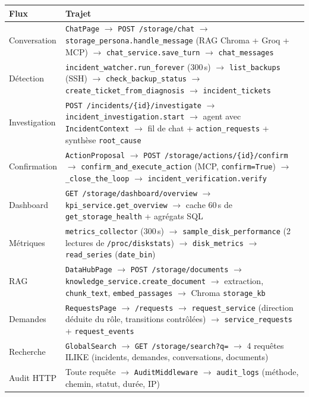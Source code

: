\documentclass[11pt,a4paper]{report}
\newcommand{\fn}[1]{\texttt{\small\textcolor{oasisviolet}{#1}}}
\newcommand{\cls}[1]{\texttt{\small\textcolor{oasisblue}{#1}}}
\newcommand{\tbl}[1]{\texttt{\small\textcolor{oasisamber}{#1}}}
\newcommand{\route}[1]{\texttt{\small\textcolor{oasisgreen}{#1}}}
\newcommand{\arrowto}{\ensuremath{\rightarrow}}
\begin{document}
\begin{longtable}{@{}p{3.4cm}p{11.5cm}@{}}
\toprule
\textbf{Flux} & \textbf{Trajet}\\
\midrule
\endhead
Conversation & \cls{ChatPage} \arrowto{} \route{POST /storage/chat} \arrowto{} \fn{storage\_persona.handle\_message} (RAG Chroma + Groq + MCP) \arrowto{} \fn{chat\_service.save\_turn} \arrowto{} \tbl{chat\_messages}\\
Détection & \fn{incident\_watcher.run\_forever} (300\,s) \arrowto{} \fn{list\_backups} (SSH) \arrowto{} \fn{check\_backup\_status} \arrowto{} \fn{create\_ticket\_from\_diagnosis} \arrowto{} \tbl{incident\_tickets}\\
Investigation & \route{POST /incidents/\{id\}/investigate} \arrowto{} \fn{incident\_investigation.start} \arrowto{} agent avec \cls{IncidentContext} \arrowto{} fil de chat + \tbl{action\_requests} + synthèse \texttt{root\_cause}\\
Confirmation & \cls{ActionProposal} \arrowto{} \route{POST /storage/actions/\{id\}/confirm} \arrowto{} \fn{confirm\_and\_execute\_action} (MCP, \texttt{confirm=True}) \arrowto{} \fn{\_close\_the\_loop} \arrowto{} \fn{incident\_verification.verify}\\
Dashboard & \route{GET /storage/dashboard/overview} \arrowto{} \fn{kpi\_service.get\_overview} \arrowto{} cache 60\,s de \fn{get\_storage\_health} + agrégats SQL\\
Métriques & \fn{metrics\_collector} (300\,s) \arrowto{} \fn{sample\_disk\_performance} (2 lectures de \texttt{/proc/diskstats}) \arrowto{} \tbl{disk\_metrics} \arrowto{} \fn{read\_series} (\texttt{date\_bin})\\
RAG & \cls{DataHubPage} \arrowto{} \route{POST /storage/documents} \arrowto{} \fn{knowledge\_service.create\_document} \arrowto{} extraction, \fn{chunk\_text}, \fn{embed\_passages} \arrowto{} Chroma \texttt{storage\_kb}\\
Demandes & \cls{RequestsPage} \arrowto{} \route{/requests} \arrowto{} \fn{request\_service} (direction déduite du rôle, transitions contrôlées) \arrowto{} \tbl{service\_requests} + \tbl{request\_events}\\
Recherche & \cls{GlobalSearch} \arrowto{} \route{GET /storage/search?q=} \arrowto{} 4 requêtes ILIKE (incidents, demandes, conversations, documents)\\
Audit HTTP & Toute requête \arrowto{} \cls{AuditMiddleware} \arrowto{} \tbl{audit\_logs} (méthode, chemin, statut, durée, IP)\\
\bottomrule
\end{longtable}
\end{document}

